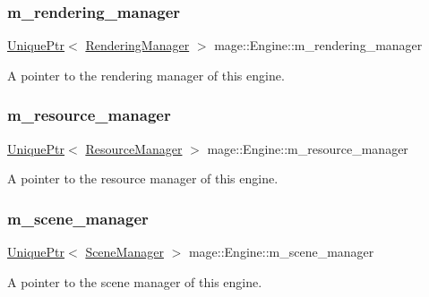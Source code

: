 \subsubsection{\texorpdfstring{m\+\_\+rendering\+\_\+manager}{m\_rendering\_manager}}
{\footnotesize\ttfamily \hyperlink{namespacemage_a3316d7143a973e37adf1110f2e80ca31}{Unique\+Ptr}$<$ \hyperlink{classmage_1_1_rendering_manager}{Rendering\+Manager} $>$ mage\+::\+Engine\+::m\+\_\+rendering\+\_\+manager\hspace{0.3cm}{\ttfamily [private]}}

A pointer to the rendering manager of this engine. \hypertarget{classmage_1_1_engine_ac8d94579e72983a99a78be6b9b606a28}{}\label{classmage_1_1_engine_ac8d94579e72983a99a78be6b9b606a28} 
\subsubsection{\texorpdfstring{m\+\_\+resource\+\_\+manager}{m\_resource\_manager}}
{\footnotesize\ttfamily \hyperlink{namespacemage_a3316d7143a973e37adf1110f2e80ca31}{Unique\+Ptr}$<$ \hyperlink{classmage_1_1_resource_manager}{Resource\+Manager} $>$ mage\+::\+Engine\+::m\+\_\+resource\+\_\+manager\hspace{0.3cm}{\ttfamily [private]}}

A pointer to the resource manager of this engine. \hypertarget{classmage_1_1_engine_afac8085ae572d623e77b1e0847440ab4}{}\label{classmage_1_1_engine_afac8085ae572d623e77b1e0847440ab4} 
\subsubsection{\texorpdfstring{m\+\_\+scene\+\_\+manager}{m\_scene\_manager}}
{\footnotesize\ttfamily \hyperlink{namespacemage_a3316d7143a973e37adf1110f2e80ca31}{Unique\+Ptr}$<$ \hyperlink{classmage_1_1_scene_manager}{Scene\+Manager} $>$ mage\+::\+Engine\+::m\+\_\+scene\+\_\+manager\hspace{0.3cm}{\ttfamily [private]}}

A pointer to the scene manager of this engine. \hypertarget{classmage_1_1_engine_a4daac998928a6c087b310c52b3f26ae4}{}\label{classmage_1_1_engine_a4daac998928a6c087b310c52b3f26ae4} 
